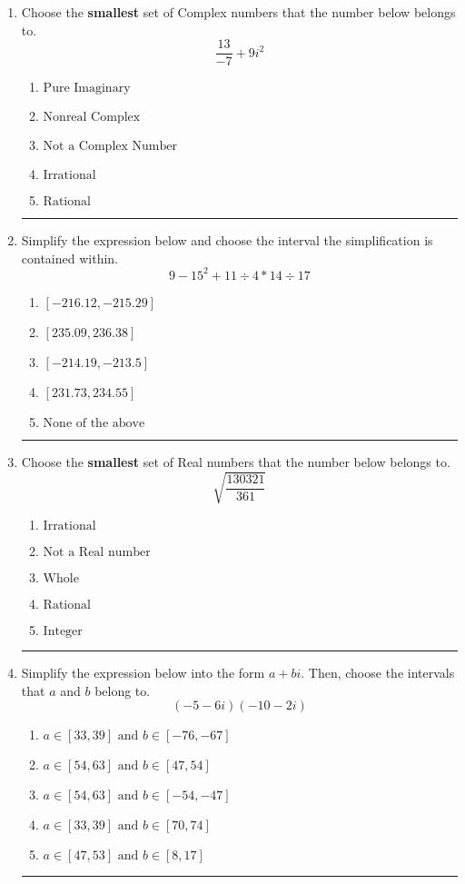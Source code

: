\documentclass[14pt]{extbook}
\newcommand{\litem}[1]{\item#1\hspace*{-1cm}\rule{\textwidth}{0.4pt}}
\begin{document}
\begin{enumerate}
\litem{
Choose the \textbf{smallest} set of Complex numbers that the number below belongs to.\[ \frac{13}{-7}+9i^2 \]\begin{enumerate}[label=\Alph*.]
\item \( \text{Pure Imaginary} \)
\item \( \text{Nonreal Complex} \)
\item \( \text{Not a Complex Number} \)
\item \( \text{Irrational} \)
\item \( \text{Rational} \)

\end{enumerate} }
\litem{
Simplify the expression below and choose the interval the simplification is contained within.\[ 9 - 15^2 + 11 \div 4 * 14 \div 17 \]\begin{enumerate}[label=\Alph*.]
\item \( [-216.12, -215.29] \)
\item \( [235.09, 236.38] \)
\item \( [-214.19, -213.5] \)
\item \( [231.73, 234.55] \)
\item \( \text{None of the above} \)

\end{enumerate} }
\litem{
Choose the \textbf{smallest} set of Real numbers that the number below belongs to.\[ \sqrt{\frac{130321}{361}} \]\begin{enumerate}[label=\Alph*.]
\item \( \text{Irrational} \)
\item \( \text{Not a Real number} \)
\item \( \text{Whole} \)
\item \( \text{Rational} \)
\item \( \text{Integer} \)

\end{enumerate} }
\litem{
Simplify the expression below into the form $a+bi$. Then, choose the intervals that $a$ and $b$ belong to.\[ (-5 - 6 i)(-10 - 2 i) \]\begin{enumerate}[label=\Alph*.]
\item \( a \in [33, 39] \text{ and } b \in [-76, -67] \)
\item \( a \in [54, 63] \text{ and } b \in [47, 54] \)
\item \( a \in [54, 63] \text{ and } b \in [-54, -47] \)
\item \( a \in [33, 39] \text{ and } b \in [70, 74] \)
\item \( a \in [47, 53] \text{ and } b \in [8, 17] \)


\end{enumerate}}
\end{enumerate}
\end{document}
